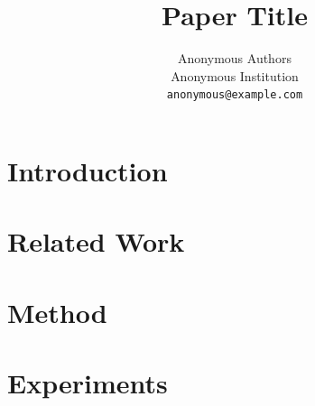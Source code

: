 \documentclass{article}
\title{Paper Title}
\author{
  Anonymous Authors\\
  Anonymous Institution\\
  \texttt{anonymous@example.com}
}
\begin{document}
\maketitle


\begin{abstract}
    
\end{abstract}



\section{Introduction}
\label{sec:intro}



\section{Related Work}
\label{sec:related}



\section{Method}
\label{sec:method}



\section{Experiments}
\label{sec:experiments}



\end{document}
